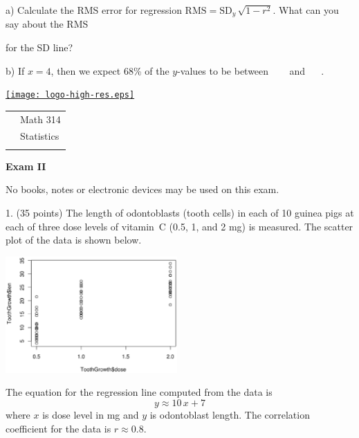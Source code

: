 \documentclass[10pt]{article}
\begin{document}
\hspace{20pt} a) Calculate the RMS error for regression 
$\mbox{RMS}=\mbox{SD}_y\,\sqrt{1-r^2}$.  What can you say about the RMS\vspace{-4pt}

\hspace{20pt}\hphantom{b) } for the SD line?
\vspace{2in}

\hspace{20pt} b) If $x=4$, then we expect 68\% of the $y$-values to be
between \ \underline{\hspace{60pt}} \ \ and \  \underline{\hspace{60pt}} \ .
\vspace{2in}



\vfill
\eject

\pagestyle{empty}

\href{http://www.shepherd.edu}{\texttt{[image: logo-high-res.eps]}}
\vspace{-1.69cm}

{\small
\begin{tabular}{cl}
& Math 314\\
& Statistics\\
\hspace{5.28in} & %
\end{tabular}
}

\begin{center}
\textbf{\large  Exam II}
\end{center}
No books, notes or electronic devices may be used on this exam.
\medskip

1. (35 points)  The length of odontoblasts (tooth cells) in each of 10 guinea pigs 
at each of three dose levels of vitamin~C (0.5, 1, and 2 mg) 
is measured.  The scatter plot of the data is shown below.

\begin{center}
\includegraphics[height=1.75in,bb=0 22 515 340, clip]{teeth.eps}
\end{center}
The equation for the regression line computed from the data is 
\[y \approx 10\,x + 7\]
where $x$ is dose level in mg and $y$ is odontoblast length.
The correlation coefficient for the data is $r\approx 0.8$.
\end{document}
